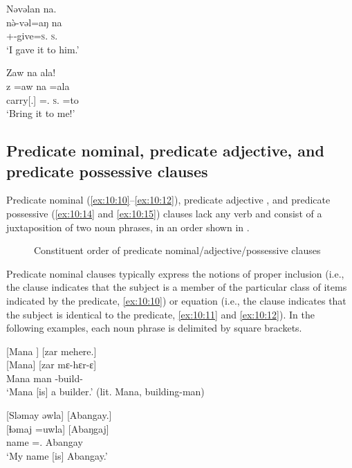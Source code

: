 \ea \label{ex:10:8}
Nəvəlan  na.\\
\gll  n\`{ə}-vəl=aŋ    na\\
      {\oneS}+{\PFV}-give=\textsc{s}.{\IO}  \textsc{s}.{\DO}\\
\glt  ‘I gave it to him.’
\z

\ea \label{ex:10:9}
Zaw  na  ala!\\
\gll  z    =aw   na   =ala\\
      carry[{\twoS}.{\IMP}]  ={\oneS}.{\IO}  \textsc{s}.{\DO}  =to\\
\glt  ‘Bring it to me!’
\z

\subsection{Predicate nominal, predicate adjective, and predicate possessive clauses}\label{sec:10.1.2}
\hypertarget{RefHeading1212881525720847}{}
Predicate nominal (\ref{ex:10:10}--\ref{ex:10:12}), predicate adjective , and predicate possessive (\ref{ex:10:14} and \ref{ex:10:15}) clauses lack any verb and consist of a juxtaposition of two noun phrases, in an order shown in .

\begin{figure}
\caption{Constituent order of predicate nominal\slash adjective\slash possessive clauses}\label{fig:17}
\end{figure}

Predicate nominal clauses typically express the notions of proper inclusion (i.e., the clause indicates that the subject is a member of the particular class of items indicated by the predicate, \ref{ex:10:10}) or equation (i.e., the clause indicates that the subject is identical to the predicate, \ref{ex:10:11} and \ref{ex:10:12}). In the following examples, each noun phrase is delimited by square brackets.

\ea \label{ex:10:10}
{} [Mana ]  [zar  mehere.]\\
\gll  {}[Mana]    [zar  mɛ-hɛr-ɛ]\\
      Mana    man  {\NOM}{}-build-{\CL}\\
\glt  ‘Mana [is] a builder.’ (lit. Mana, building-man)
\z

\ea \label{ex:10:11}
{}[Sləmay  əwla]  [Abangay.]\\
\gll  {}[ɬəmaj   =uwla]  [Abaŋgaj]\\
      name  ={\oneS}.{\POSS}  Abangay\\
\glt  ‘My name [is] Abangay.’
\z

